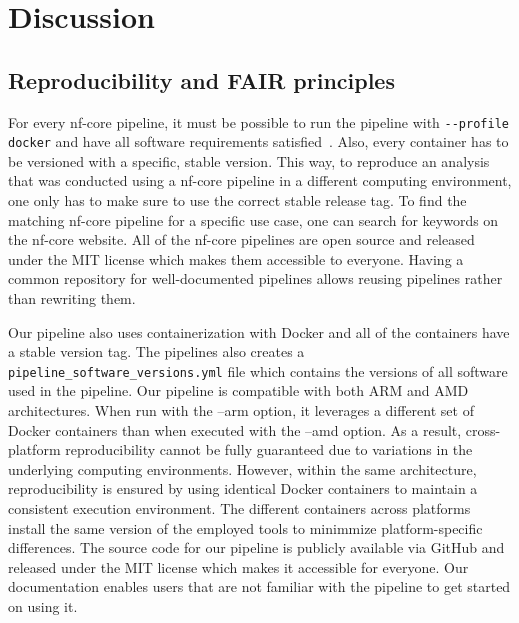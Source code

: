 \documentclass[12pt]{article}
\begin{document}
\section{Discussion}
\subsection{Reproducibility and FAIR principles}
For every nf-core pipeline, it must be possible to run the pipeline with \verb|--profile docker| and have all software requirements satisfied~\cite{ewels2020nf}. Also, every container has to be versioned with a specific, stable version. This way, to reproduce an analysis that was conducted using a nf-core pipeline in a different computing environment, one only has to make sure to use the correct stable release tag. To find the matching nf-core pipeline for a specific use case, one can search for keywords on the nf-core website. All of the nf-core pipelines are open source and released under the MIT license which makes them accessible to everyone. Having a common repository for well-documented pipelines allows reusing pipelines rather than rewriting them.

Our pipeline also uses containerization with Docker and all of the containers have a stable version tag. The pipelines also creates a \verb|pipeline_software_versions.yml| file which contains the versions of all software used in the pipeline. Our pipeline is compatible with both ARM and AMD architectures. When run with the --arm option, it leverages a different set of Docker containers than when executed with the --amd option. As a result, cross-platform reproducibility cannot be fully guaranteed due to variations in the underlying computing environments. However, within the same architecture, reproducibility is ensured by using identical Docker containers to maintain a consistent execution environment. The different containers across platforms install the same version of the employed tools to minimmize platform-specific differences. The source code for our pipeline is publicly available via GitHub and released under the MIT license which makes it accessible for everyone. Our documentation enables users that are not familiar with the pipeline to get started on using it.
\end{document}
